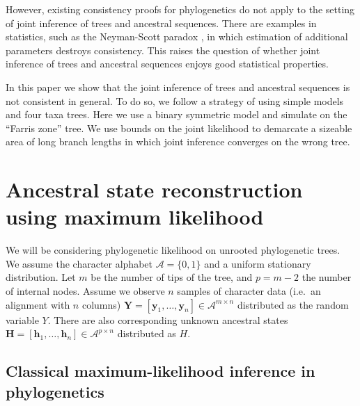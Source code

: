 \documentclass[a4paper]{article}
\newcommand{\alphabet}{\mathcal{A}}
\newcommand{\fullAlignment}{\mathbf{Y}}
\newcommand{\alignmentColumn}{\mathbf{y}}
\newcommand{\alignmentColumnRV}{Y}
\newcommand{\fullAncestralStates}{\mathbf{H}}
\newcommand{\ancestralStateColumn}{\mathbf{h}}
\newcommand{\ancestralStateColumnRV}{H}
\newcommand{\nCols}{n}
\newcommand{\nSiteRows}{m}
\newcommand{\nAncestralStateRows}{p}
\begin{document}
However, existing consistency proofs for phylogenetics \cite{RoyChoudhury2015-ta} do not apply to the setting of joint inference of trees and ancestral sequences.
There are examples in statistics, such as the Neyman-Scott paradox \cite{Neyman1948-tt}, in which estimation of additional parameters destroys consistency.
This raises the question of whether joint inference of trees and ancestral sequences enjoys good statistical properties.

In this paper we show that the joint inference of trees and ancestral sequences is not consistent in general.
To do so, we follow a strategy of using simple models and four taxa trees.
Here we use a binary symmetric model and simulate on the ``Farris zone'' \cite{Siddall1998-hq} tree.
We use bounds on the joint likelihood to demarcate a sizeable area of long branch lengths in which joint inference converges on the wrong tree.

\section{Ancestral state reconstruction using maximum likelihood}

We will be considering phylogenetic likelihood on unrooted phylogenetic trees.
We assume the character alphabet $\alphabet=\{0,1\}$ and a uniform stationary distribution.
Let $\nSiteRows$ be the number of tips of the tree, and $\nAncestralStateRows = \nSiteRows-2$ the number of internal nodes.
Assume we observe $\nCols$ samples of character data (i.e.\ an alignment with $\nCols$ columns) $\fullAlignment=[\alignmentColumn_1,\ldots,\alignmentColumn_\nCols]\in\alphabet^{\nSiteRows\times\nCols}$ distributed as the random variable $\alignmentColumnRV$.
There are also corresponding unknown ancestral states $\fullAncestralStates=[\ancestralStateColumn_1,\ldots,\ancestralStateColumn_\nCols]\in\alphabet^{\nAncestralStateRows\times\nCols}$ distributed as $\ancestralStateColumnRV$.

\subsection{Classical maximum-likelihood inference in phylogenetics}
\end{document}
